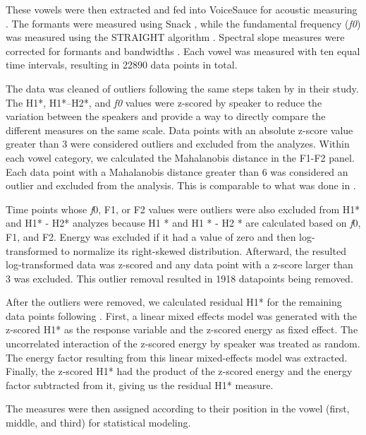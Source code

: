 These vowels were then extracted and fed into VoiceSauce for acoustic measuring \citep{shueVoiceSauceProgramVoice2011}. The formants were measured using Snack \citep{sjolanderSnackSoundToolkit2004}, while the fundamental frequency (\textit{f0}) was measured using the STRAIGHT algorithm \citep{kawaharaInstantaneousfrequencybasedPitchExtraction1998}. Spectral slope measures were corrected for formants and bandwidths \citep{hansonGlottalCharacteristicsFemale1997,iseliAgeSexVowel2007}. Each vowel was measured with ten equal time intervals, resulting in 22890 data points in total.

The data was cleaned of outliers following the same steps taken by \citet{chaiH1H2Acoustic2022} in their study. The H1*, H1*–H2*, and \textit{f0} values were z-scored by speaker to reduce the variation between the speakers and provide a way to directly compare the different measures on the same scale. Data points with an absolute z-score value greater than 3 were considered outliers and excluded from the analyzes. Within each vowel category, we calculated the Mahalanobis distance in the F1-F2 panel. Each data point with a Mahalanobis distance greater than 6 was considered an outlier and excluded from the analysis. This is comparable to what was done in \citet{garellekPhoneticsWhiteHmong2021,seyfarthPlosiveVoicingAcoustics2018,chaiCheckedSyllablesChecked2022}. 

Time points whose \textit{f}0, F1, or F2 values were outliers were also excluded from H1* and H1* - H2* analyzes because H1 * and H1 * - H2 * are calculated based on \textit{f}0, F1, and F2. Energy was excluded if it had a value of zero and then log-transformed to normalize its right-skewed distribution. Afterward, the resulted log-transformed data was z-scored and any data point with a z-score larger than 3 was excluded. This outlier removal resulted in 1918 datapoints being removed. 

After the outliers were removed, we calculated residual H1* for the remaining data points following \citet{chaiH1H2Acoustic2022}. First, a linear mixed effects model was generated with the z-scored H1* as the response variable and the z-scored energy as fixed effect. The uncorrelated interaction of the z-scored energy by speaker was treated as random. The energy factor resulting from this linear mixed-effects model was extracted. Finally, the z-scored H1* had the product of the z-scored energy and the energy factor subtracted from it, giving us the residual H1* measure.

The measures were then assigned according to their position in the vowel (first, middle, and third) for statistical modeling.  

